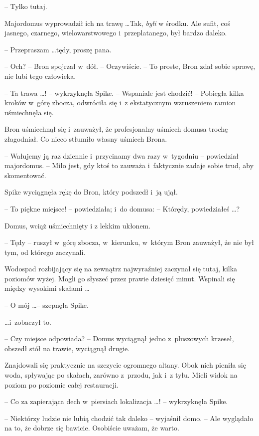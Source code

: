 \documentclass[oneside,polish,11pt,rmheadings]{mwbk}
\begin{document}
-- Tylko tutaj. 

Majordomus wyprowadził ich na trawę \ldots  Tak, \textit{byli }w środku. Ale sufit, coś jasnego, czarnego, wielowarstwowego i~przeplatanego, był bardzo daleko. 

-- Przepraszam \ldots  tędy, proszę pana. 

-- Och? -- Bron spojrzał w~dół. -- Oczywiście. -- To proste, Bron zdał sobie sprawę, nie lubi tego człowieka. 

-- Ta trawa \ldots ! -- wykrzyknęła Spike. -- Wspaniale jest chodzić! -- Pobiegła kilka kroków w~górę zbocza, odwróciła się i~z ekstatycznym wzruszeniem ramion uśmiechnęła się. 

Bron uśmiechnął się i~zauważył, że profesjonalny uśmiech domusa trochę złagodniał. Co nieco stłumiło własny uśmiech Brona. 

-- Wałujemy ją raz dziennie i~przycinamy dwa razy w~tygodniu -- powiedział majordomus. -- Miło jest, gdy ktoś to zauważa i~faktycznie zadaje sobie trud, aby skomentować. 

Spike wyciągnęła rękę do Bron, który podszedł i~ją ujął. 

-- To piękne miejsce! -- powiedziała; i~do domusa: -- Którędy, powiedziałeś \ldots ? 

Domus, wciąż uśmiechnięty i z lekkim ukłonem.

-- Tędy -- ruszył w~górę zbocza, w~kierunku, w~którym Bron zauważył, że nie był tym, od którego zaczynali. 

Wodospad rozbijający się na zewnątrz najwyraźniej zaczynał się tutaj, kilka poziomów wyżej. Mogli go słyszeć przez prawie dziesięć minut. Wspinali się między wysokimi skałami \ldots  

-- O mój  \ldots  -- szepnęła Spike. 

 \ldots  i~zobaczył to. 

-- Czy miejsce odpowiada?  -- Domus wyciągnął jedno z~pluszowych krzeseł, obszedł stół na trawie, wyciągnął drugie. 

Znajdowali się praktycznie na szczycie ogromnego altany. Obok nich pieniła się woda, spływając po skałach, zarówno z~przodu, jak i~z tyłu. Mieli widok na poziom po poziomie całej restauracji. 

-- Co za zapierająca dech w~piersiach lokalizacja  \ldots ! -- wykrzyknęła Spike. 

-- Niektórzy ludzie nie lubią chodzić tak daleko -- wyjaśnił domo. -- Ale wyglądało na to, że dobrze się bawicie. Osobiście uważam, że warto. 
\end{document}
